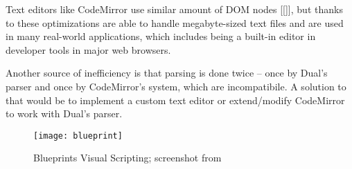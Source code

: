 Text editors like CodeMirror use similar amount of DOM nodes [[]], but thanks to
these optimizations are able to handle
megabyte-sized\cite[Section~General Approach]{cm_internals}
text files and are used in many real-world
applications\cite{cm_realworld}, which
includes being a built-in editor in developer tools in major web browsers.

Another source of inefficiency is that parsing is done twice -- once by Dual's
parser and once by CodeMirror's system, which are incompatibile.  A solution to
that would be to implement a custom text editor or extend/modify CodeMirror to
work with Dual's parser.


\begin{figure}[h!]
\centering \texttt{[image: blueprint]}
\caption{
    Blueprints Visual Scripting;
    screenshot from \protect\cite{fig_blueprint2}
}
\label{fig:blueprint2}
\end{figure}


